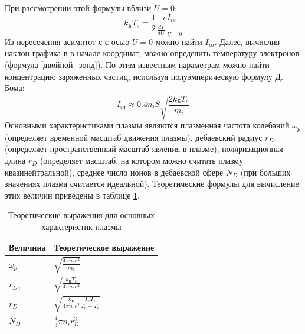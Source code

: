 \documentclass[a4paper,12pt]{article} %
\begin{document}
При рассмотрении этой формулы вблизи $U = 0$:
\begin{equation}
\label{двойной_зонд}
k_БT_e = \frac{1}{2}\frac{eI_{iн}}{\frac{dI}{dU}|_{U=0}}
\end{equation}
Из пересечения асимптот с с осью $U=0$ можно найти $I_{in}$. Далее, вычислив наклон графика в в начале координат, можно определить температуру электронов (формула \ref{двойной_зонд}). По этим известным параметрам можно найти концентрацию заряженных частиц, используя полуэмперическую формулу Д. Бома:
\begin{equation} 
\label{бом}
I_{iн} \approx 0.4 n_iS\sqrt{\frac{2k_БT_e}{m_i}}
\end{equation}
Основными характеристиками плазмы являются плазменная частота колебаний $\omega_p$ (определяет временной масштаб движения плазмы), дебаевский радиус $r_{De}$ (определяет пространственный масштаб явления в плазме), поляризационная длина $r_D$ (определяет масштаб, на котором можно считать плазму квазинейтральной), среднее число ионов в дебаевской сфере $N_D$ (при больших значениях плазма считается идеальной). Теоретические формулы для вычисление этих величин приведены в таблице \ref{формулы}.
\begin{table}[h!]
\caption{Теоретические выражения для основных характеристик плазмы}
\label{формулы}
\begin{tabular}{|l|l|}
\hline
Величина   & Теоретическое выражение                                 \\ \hline
$\omega_p$ & $\sqrt{\frac{4\pi n_e e^2}{m_e}}$                       \\ \hline
$r_{De} $  & $\sqrt{\frac{k_Б T_e}{4\pi n_e e^2}}$                   \\ \hline
$r_D $     & $\sqrt{\frac{k_Б}{4\pi n_e e^2}\frac{T_eT_i}{T_e+T_i}}$ \\ \hline
$N_D $     & $\frac{4}{3}\pi n_ir^3_D$                               \\ \hline
\end{tabular}
\end{table}
\end{document}
